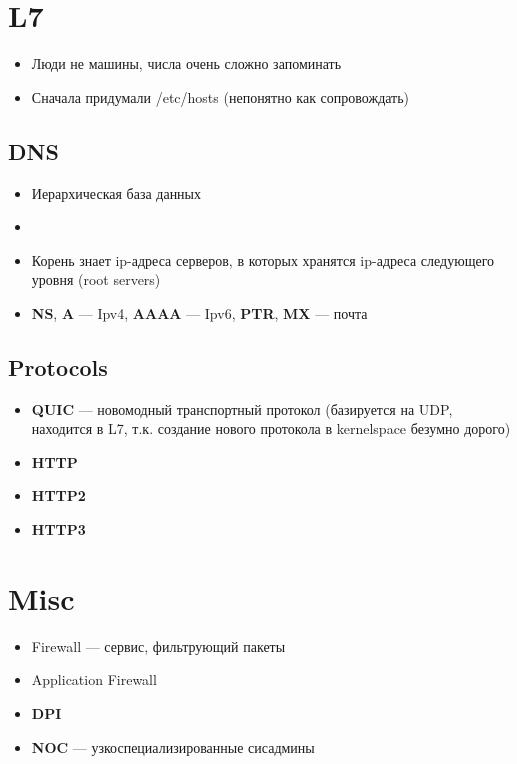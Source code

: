 \section{L7}
\begin{itemize}
    \item Люди не машины, числа очень сложно запоминать
    \item Сначала придумали /etc/hosts (непонятно как сопровождать)
\end{itemize}
\subsection{DNS}
\begin{itemize}
    \item Иерархическая база данных
    \item {}
    \item Корень знает ip-адреса серверов, в которых хранятся ip-адреса следующего уровня (root servers)
    \item \textbf{NS}, \textbf{A} --- Ipv4, \textbf{AAAA} --- Ipv6, \textbf{PTR}, \textbf{MX} --- почта
\end{itemize}
\subsection{Protocols}
\begin{itemize}
    \item \textbf{QUIC} --- новомодный транспортный протокол (базируется на UDP, находится в L7, т.к. создание нового протокола в kernelspace безумно дорого)
    \item \textbf{HTTP}
    \item \textbf{HTTP2}
    \item \textbf{HTTP3}
\end{itemize}

\section{Misc}
\begin{itemize}
    \item Firewall --- сервис, фильтрующий пакеты
    \item Application Firewall
    \item \textbf{DPI}
    \item \textbf{NOC} --- узкоспециализированные сисадмины
\end{itemize}
